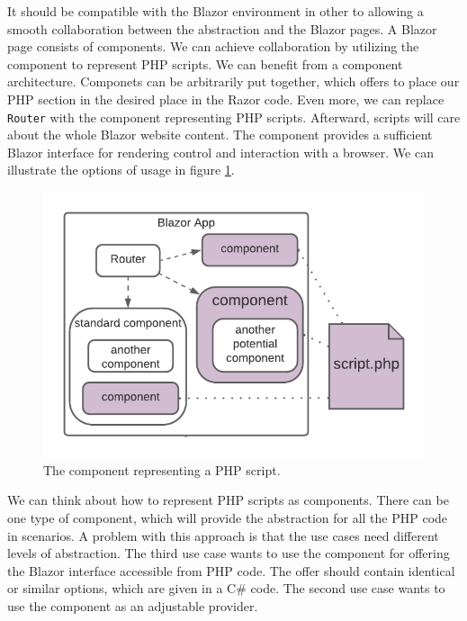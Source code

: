 It should be compatible with the Blazor environment in other to allowing a smooth collaboration between the abstraction and the Blazor pages.
A Blazor page consists of components.
We can achieve collaboration by utilizing the component to represent PHP scripts.
We can benefit from a component architecture.
Componets can be arbitrarily put together, which offers to place our PHP section in the desired place in the Razor code.
Even more, we can replace \texttt{Router} with the component representing PHP scripts.
Afterward, scripts will care about the whole Blazor website content.
The component provides a sufficient Blazor interface for rendering control and interaction with a browser. 
We can illustrate the options of usage in figure \ref{img12:component}.
\par
\begin{figure}[t]\centering
\includegraphics{./img/component}
\caption{The component representing a PHP script.}
\label{img12:component}
\end{figure} 
\par
We can think about how to represent PHP scripts as components.
There can be one type of component, which will provide the abstraction for all the PHP code in scenarios.
A problem with this approach is that the use cases need different levels of abstraction.
The third use case wants to use the component for offering the Blazor interface accessible from PHP code.
The offer should contain identical or similar options, which are given in a C\# code.
The second use case wants to use the component as an adjustable provider.
